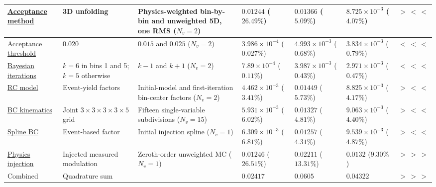 \begin{longtable}{|p{2.45cm}|p{3.20cm}|p{3.35cm}|p{1.55cm}|p{1.55cm}|p{1.55cm}|p{1.15cm}|}
\hline
\hyperref[sys-acc-method]{Acceptance method}& 3D unfolding& Physics-weighted bin-by-bin and unweighted 5D, one RMS (\(N_{v} = 2\)) & $0.01244$ {\scriptsize($26.49\%$)} & $0.01366$ {\scriptsize($5.09\%$)} & $8.725\times 10^{-3}$ {\scriptsize($4.07\%$)} & $>\,<\,<$ \\
\hline
\hyperref[sys-acc-threshold]{Acceptance threshold}& $0.020$& $0.015$ and $0.025$ (\(N_{v} = 2\)) & $3.986\times 10^{-4}$ {\scriptsize($0.027\%$)} & $4.993\times 10^{-3}$ {\scriptsize($0.68\%$)} & $3.834\times 10^{-3}$ {\scriptsize($0.79\%$)} & $<\,<\,<$ \\
\hline
\hyperref[sys-bayes-iter]{Bayesian iterations}& $k=6$ in bins 1 and 5; $k=5$ otherwise& $k-1$ and $k+1$ (\(N_{v} = 2\)) & $7.89\times 10^{-4}$ {\scriptsize($0.11\%$)} & $3.987\times 10^{-3}$ {\scriptsize($0.43\%$)} & $2.971\times 10^{-3}$ {\scriptsize($0.47\%$)} & $<\,<\,<$ \\
\hline
\hyperref[sys-rc-model]{RC model}& Event-yield factors& Initial-model and first-iteration bin-center factors (\(N_{v} = 2\)) & $4.462\times 10^{-3}$ {\scriptsize($3.41\%$)} & $0.01449$ {\scriptsize($5.73\%$)} & $8.825\times 10^{-3}$ {\scriptsize($4.17\%$)} & $>\,<\,<$ \\
\hline
\hyperref[sys-bc-kin]{BC kinematics}& Joint $3{\times}3{\times}3{\times}3{\times}5$ grid& Fifteen single-variable subdivisions (\(N_{v} = 15\)) & $5.931\times 10^{-3}$ {\scriptsize($6.02\%$)} & $0.01327$ {\scriptsize($4.81\%$)} & $9.063\times 10^{-3}$ {\scriptsize($4.40\%$)} & $>\,<\,<$ \\
\hline
\hyperref[sys-bc-iter]{Spline BC}& Event-based factor& Initial injection spline (\(N_{v} = 1\)) & $6.309\times 10^{-3}$ {\scriptsize($6.81\%$)} & $0.01257$ {\scriptsize($4.31\%$)} & $9.539\times 10^{-3}$ {\scriptsize($4.87\%$)} & $>\,<\,<$ \\
\hline
\hyperref[sys-mod-spline]{Physics injection}& Injected measured modulation& Zeroth-order unweighted MC (\(N_{v} = 1\)) & $0.01246$ {\scriptsize($26.51\%$)} & $0.02211$ {\scriptsize($13.31\%$)} & $0.0132$ {\scriptsize($9.30\%$)} & $>\,>\,>$ \\
\hline
Combined& Quadrature sum& & $0.02417$ & $0.0605$ & $0.04322$ & $>\,>\,>$ \\

\end{longtable}
